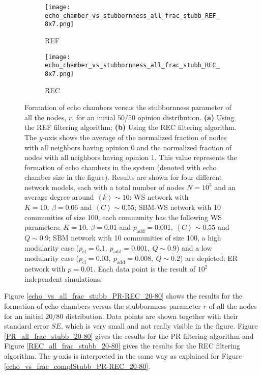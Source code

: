 \documentclass[11 pt , letterpaper , twoside , openright]{book}
\begin{document}
\begin{figure}[H]
  \begin{subfigure}[b]{0.49\textwidth}
  	\texttt{[image: echo\_chamber\_vs\_stubbornness\_all\_frac\_stubb\_REF\_8x7.png]}
    \caption{REF}
    \label{REF_all_frac_stubb}
  \end{subfigure}
  \begin{subfigure}[b]{0.49\textwidth}
  	\texttt{[image: echo\_chamber\_vs\_stubbornness\_all\_frac\_stubb\_REC\_8x7.png]}
    \caption{REC}
    \label{REC_all_frac_stubb}
  \end{subfigure}
  \captionsetup{format=plain}
  \caption[Formation of echo chambers versus the stubbornness parameter of all the nodes, $r$, for the REF and REC filtering algorithms and an initial $50/50$ opinion distribution]{Formation of echo chambers versus the stubbornness parameter of all the nodes, $r$, for an initial $50/50$ opinion distribution. \textbf{(a)} Using the REF filtering algorithm; \textbf{(b)} Using the REC filtering algorithm. The $y$-axis shows the average of the normalized fraction of nodes with all neighbors having opinion 0 and the normalized fraction of nodes with all neighbors having opinion 1. This value represents the formation of echo chambers in the system (denoted with echo chamber size in the figure). Results are shown for four different network models, each with a total number of nodes $N=10^3$ and an average degree around $\left<k\right> \sim 10$: WS network with $K =10,\ \beta = 0.06$ and $\left<C\right> \sim 0.55$; SBM-WS network with 10 communities of size 100, each community has the following WS parameters: $K = 10,\ \beta = 0.01$ and $p_{\text{add}} = 0.001$, $\left<C\right> \sim 0.55$ and $Q \sim 0.9$; SBM network with 10 communities of size 100, a high modularity case ($p_{\text{cl}} = 0.1,\ p_{\text{add}} = 0.001,\ Q \sim 0.9$) and a low modularity case ($p_{\text{cl}} = 0.03,\ p_{\text{add}} = 0.008,\ Q \sim 0.2$) are depicted; ER network with $p= 0.01$. Each data point is the result of $10^2$ independent simulations.}
\label{echo_vs_all_frac_stubb_REF-REC}
\end{figure}
\noindent
Figure \ref{echo_vs_all_frac_stubb_PR-REC_20-80} shows the results for the formation of echo chambers versus the stubbornness parameter $r$ of all the nodes for an initial $20/80$ distribution. Data points are shown together with their standard error $SE$, which is very small and not really visible in the figure. Figure \ref{PR_all_frac_stubb_20-80} gives the results for the PR filtering algorithm and Figure \ref{REC_all_frac_stubb_20-80} gives the results for the REC filtering algorithm. The $y$-axis is interpreted in the same way as explained for Figure \ref{echo_vs_frac_complStubb_PR-REC_20-80}.\\
\end{document}
